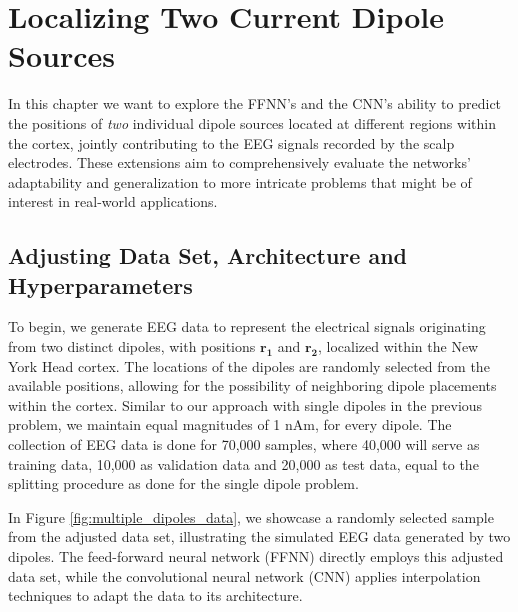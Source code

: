 \documentclass[a4paper, UKenglish, 11pt]{uiomaster}
\begin{document}
\chapter{Localizing Two Current Dipole Sources} \label{chap:two_dipole_FFNN}
In this chapter we want to explore the FFNN's and the CNN's ability to predict the positions of \emph{two} individual dipole sources located at different regions within the cortex, jointly contributing to the EEG signals recorded by the scalp electrodes. These extensions aim to comprehensively evaluate the networks' adaptability and generalization to more intricate problems that might be of interest in real-world applications.


\section{Adjusting Data Set, Architecture and Hyperparameters}
To begin, we generate EEG data to represent the electrical signals originating from two distinct dipoles, with positions $\mathbf{r_1}$ and $\mathbf{r_2}$, localized within the New York Head cortex. The locations of the dipoles are randomly selected from the available positions, allowing for the possibility of neighboring dipole placements within the cortex. Similar to our approach with single dipoles in the previous problem, we maintain equal magnitudes of 1 nAm, for every dipole. The collection of EEG data is done for 70,000 samples, where 40,000 will serve as training data, 10,000 as validation data and 20,000 as test data, equal to the splitting procedure as done for the single dipole problem.

In Figure \ref{fig:multiple_dipoles_data}, we showcase a randomly selected sample from the adjusted data set, illustrating the simulated EEG data generated by two dipoles. The feed-forward neural network (FFNN) directly employs this adjusted data set, while the convolutional neural network (CNN) applies interpolation techniques to adapt the data to its architecture.
\end{document}
